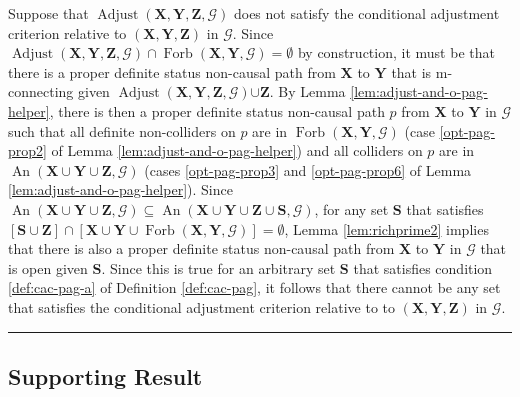 \documentclass[twoside]{article}
\DeclareMathOperator{\An}{An}
\DeclareMathOperator{\Forb}{Forb}
\newcommand{\fb}[2][X,Y]{\Forb(\mb{#1},#2)}
\DeclareMathOperator{\Adjust}{Adjust}
\newcommand{\adjustb}[2][X,Y,Z]{\Adjust(\mb{#1},#2)}
\newcommand{\mb}[1]{\mathbf{#1}}
\newcommand{\g}[1][G]{\mathcal{#1}}
\newenvironment{proofof}[1][]{\begin{trivlist}
\item[\hskip \labelsep {\bfseries Proof of #1.}]}{\hfill\BlackBox\end{trivlist}}
\newcommand{\BlackBox}{\rule{1.5ex}{1.5ex}}
\begin{document}
\begin{proofof}[Theorem \ref{thm:adjust-and-o-pag}]
    Suppose that $\adjustb{\g}$ does not satisfy the conditional adjustment criterion relative to $(\mb{X,Y,Z})$ in $\g$. Since $\adjustb{\g} \cap \fb{\g} = \emptyset$ by construction, it must be that there is a proper definite status non-causal path from $\mb{X}$ to $\mb{Y}$ that is m-connecting given $\adjustb{\g} {\cup \mb{Z}}$. By Lemma \ref{lem:adjust-and-o-pag-helper}, there is then a proper definite status non-causal path $p$ from $\mb{X}$ to $\mb{Y}$ in $\g$ such that all {definite non-colliders on $p$ are in $\fb{\g}$ (case \ref{opt-pag-prop2} of Lemma \ref{lem:adjust-and-o-pag-helper}) and all colliders on $p$ are in $\An(\mb{X} \cup \mb{Y} \cup \mb{Z}, \g)$ (cases \ref{opt-pag-prop3} and \ref{opt-pag-prop6} of Lemma \ref{lem:adjust-and-o-pag-helper}). Since $\An(\mb{X} \cup \mb{Y} \cup \mb{Z}, \g) \subseteq \An(\mb{X} \cup \mb{Y} \cup \mb{Z} \cup \mb{S}, \g)$, for any set $\mb{S}$ that satisfies $[\mb{S} \cup \mb{Z}] \cap [\mb{X} \cup \mb{Y} \cup \fb{\g}] = \emptyset$, Lemma \ref{lem:richprime2} implies that there is also a proper definite status non-causal path from $\mb{X}$ to $\mb{Y}$ in $\g$ that is open given $\mb{S}$. Since this is true for an arbitrary set $\mb{S}$ that satisfies condition \ref{def:cac-pag-a} of Definition \ref{def:cac-pag},} it follows that there cannot be any set that satisfies the conditional adjustment criterion relative to to $(\mb{X,Y,Z})$ in $\g$.
\end{proofof}




\subsection{Supporting Result}
\end{document}
